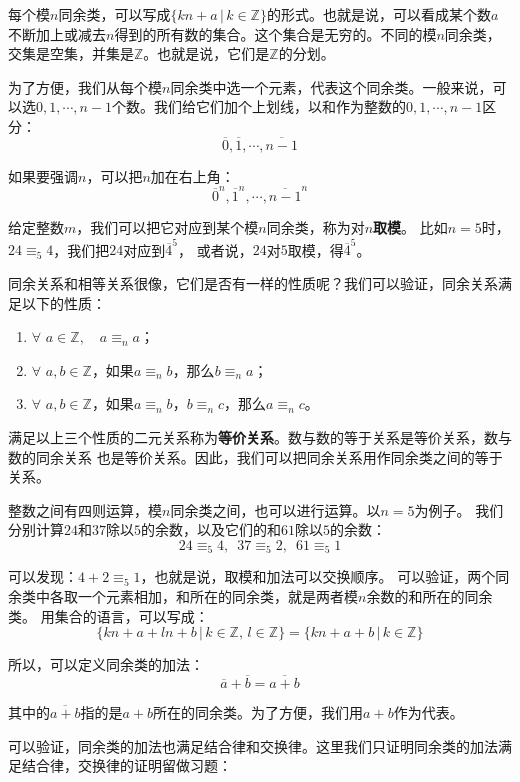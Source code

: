 \documentclass[12pt,UTF8]{ctexbook}
\begin{document}
每个模$n$同余类，可以写成$\{kn + a \, | \, k\in\mathbb{Z} \}$的形式。也就是说，可以看成某个数$a$不断加上或减去$n$得到的所有数的集合。这个集合是无穷的。不同的模$n$同余类，交集是空集，并集是$\mathbb{Z}$。也就是说，它们是$\mathbb{Z}$的分划。

为了方便，我们从每个模$n$同余类中选一个元素，代表这个同余类。一般来说，可以选$0,1,\cdots,n-1$个数。我们给它们加个上划线，以和作为整数的$0,1,\cdots,n-1$区分：
$$\overline{0},\overline{1},\cdots,\overline{n-1}$$

如果要强调$n$，可以把$n$加在右上角：
$$\overline{0}^n,\overline{1}^n,\cdots,\overline{n-1}^n$$

给定整数$m$，我们可以把它对应到某个模$n$同余类，称为对$n$\textbf{取模}。
比如$n=5$时，$24 \equiv_5 4$，我们把$24$对应到$\overline{4}^5$，
或者说，$24$对$5$取模，得$\overline{4}^5$。

同余关系和相等关系很像，它们是否有一样的性质呢？我们可以验证，同余关系满足以下的性质：
\begin{enumerate}
    \item $\forall \,\, a\in \mathbb{Z}, \quad a \equiv_n a$；
    \item $\forall \,\, a, b \in \mathbb{Z}$，如果$a \equiv_n b$，那么$b \equiv_n a$；
    \item $\forall \,\, a, b \in \mathbb{Z}$，如果$a \equiv_n b$，$b \equiv_n c$，那么$a \equiv_n c$。
\end{enumerate}

满足以上三个性质的二元关系称为\textbf{等价关系}。数与数的等于关系是等价关系，数与数的同余关系
也是等价关系。因此，我们可以把同余关系用作同余类之间的等于关系。

整数之间有四则运算，模$n$同余类之间，也可以进行运算。以$n=5$为例子。
我们分别计算$24$和$37$除以$5$的余数，以及它们的和$61$除以$5$的余数：
$$ 24 \equiv_5 4, \,\,\, 37 \equiv_5 2 , \,\,\, 61 \equiv_5 1$$

可以发现：$ 4 + 2 \equiv_5 1$，也就是说，取模和加法可以交换顺序。
可以验证，两个同余类中各取一个元素相加，和所在的同余类，就是两者模$n$余数的和所在的同余类。
用集合的语言，可以写成：
$$\{kn + a + ln + b \, | \, k\in\mathbb{Z}, \, l\in\mathbb{Z} \} = \{kn + a + b \, | \, k\in\mathbb{Z} \}$$

所以，可以定义同余类的加法：
$$ \overline{a} + \overline{b} = \overline{a + b}$$

其中的$\overline{a + b}$指的是$a+b$所在的同余类。为了方便，我们用$a + b$作为代表。

可以验证，同余类的加法也满足结合律和交换律。这里我们只证明同余类的加法满足结合律，交换律的证明留做习题：
\end{document}
